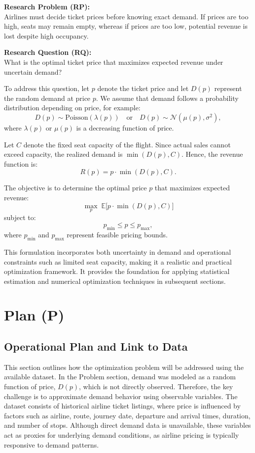 \documentclass[12pt]{article}
\begin{document}
\textbf{Research Problem (RP):} \\
Airlines must decide ticket prices before knowing exact demand. If prices are too high, seats may remain empty, whereas if prices are too low, potential revenue is lost despite high occupancy.

\vspace{0.3cm}

\textbf{Research Question (RQ):} \\
What is the optimal ticket price that maximizes expected revenue under uncertain demand?

\vspace{0.3cm}

To address this question, let $p$ denote the ticket price and let $D(p)$ represent the random demand at price $p$. We assume that demand follows a probability distribution depending on price, for example:
\[
D(p) \sim \text{Poisson}(\lambda(p)) \quad \text{or} \quad D(p) \sim \mathcal{N}(\mu(p), \sigma^2),
\]
where $\lambda(p)$ or $\mu(p)$ is a decreasing function of price.

Let $C$ denote the fixed seat capacity of the flight. Since actual sales cannot exceed capacity, the realized demand is $\min(D(p), C)$. Hence, the revenue function is:
\[
R(p) = p \cdot \min(D(p), C).
\]

The objective is to determine the optimal price $p$ that maximizes expected revenue:
\[
\max_{p} \; \mathbb{E}\big[ p \cdot \min(D(p), C) \big]
\]
subject to:
\[
p_{\min} \leq p \leq p_{\max},
\]
where $p_{\min}$ and $p_{\max}$ represent feasible pricing bounds.

This formulation incorporates both uncertainty in demand and operational constraints such as limited seat capacity, making it a realistic and practical optimization framework. It provides the foundation for applying statistical estimation and numerical optimization techniques in subsequent sections.

\section{Plan (P)}
\subsection{Operational Plan and Link to Data}

This section outlines how the optimization problem will be addressed using the available dataset. In the Problem section, demand was modeled as a random function of price, $D(p)$, which is not directly observed. Therefore, the key challenge is to approximate demand behavior using observable variables. The dataset consists of historical airline ticket listings, where price is influenced by factors such as airline, route, journey date, departure and arrival times, duration, and number of stops. Although direct demand data is unavailable, these variables act as proxies for underlying demand conditions, as airline pricing is typically responsive to demand patterns.
\end{document}
